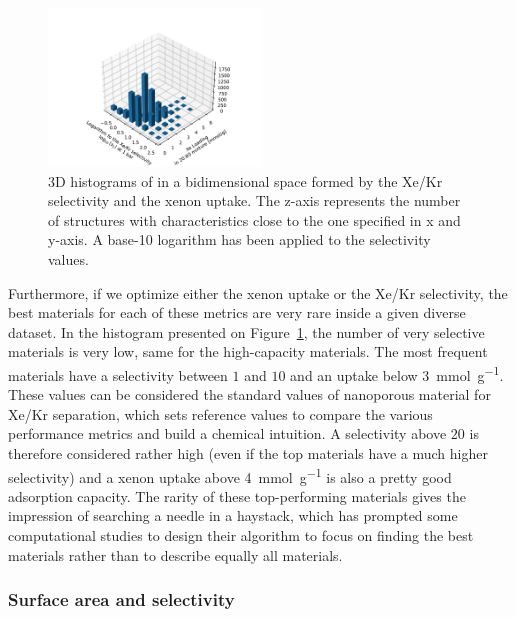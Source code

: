 \documentclass[main.tex]{subfiles}
\begin{document}
\begin{figure}[ht]
  \centering
  \includegraphics[width=0.5\textwidth,trim={2cm 0 2cm 2cm},clip]{figures/2-thermo/3D_hist_selec_uptake.pdf}
  \caption{3D histograms of in a bidimensional space formed by the Xe/Kr selectivity and the xenon uptake. The z-axis represents the number of structures with characteristics close to the one specified in x and y-axis. A base-10 logarithm has been applied to the selectivity values.}\label{fgr:3D_uptake}
\end{figure}

Furthermore, if we optimize either the xenon uptake or the Xe/Kr selectivity, the best materials for each of these metrics are very rare inside a given diverse dataset. In the histogram presented on Figure~\ref{fgr:3D_uptake}, the number of very selective materials is very low, same for the high-capacity materials. The most frequent materials have a selectivity between $1$ and $10$ and an uptake below \SI{3}{\milli\mole\per\gram}. These values can be considered the standard values of nanoporous material for Xe/Kr separation, which sets reference values to compare the various performance metrics and build a chemical intuition. A selectivity above $20$ is therefore considered rather high (even if the top materials have a much higher selectivity\autocite{Pei_2022}) and a xenon uptake above \SI{4}{\milli\mole\per\gram} is also a pretty good adsorption capacity. The rarity of these top-performing materials gives the impression of searching a needle in a haystack, which has prompted some computational studies to design their algorithm to focus on finding the best materials rather than to describe equally all materials.\autocite{Deshwal_2021,Glasby_2021} 

\subsubsection{Surface area and selectivity}
\end{document}
